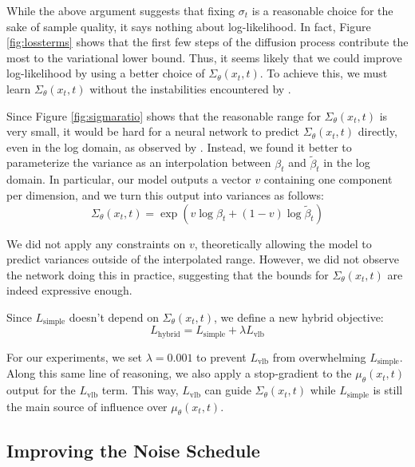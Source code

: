 \documentclass{article}
\begin{document}
While the above argument suggests that fixing $\sigma_t$ is a reasonable choice for the sake of sample quality, it says nothing about log-likelihood. In fact, Figure \ref{fig:lossterms} shows that the first few steps of the diffusion process contribute the most to the variational lower bound. Thus, it seems likely that we could improve log-likelihood by using a better choice of $\Sigma_{\theta}(x_t, t)$. To achieve this, we must learn $\Sigma_{\theta}(x_t, t)$ without the instabilities encountered by \citet{ddpm}.

Since Figure \ref{fig:sigmaratio} shows that the reasonable range for $\Sigma_{\theta}(x_t, t)$ is very small, it would be hard for a neural network to predict $\Sigma_{\theta}(x_t, t)$ directly, even in the log domain, as observed by \citet{ddpm}. Instead, we found it better to parameterize the variance as an interpolation between $\beta_t$ and $\tilde{\beta}_t$ in the log domain. In particular, our model outputs a vector $v$ containing one component per dimension, and we turn this output into variances as follows:
\begin{equation}
\Sigma_{\theta}(x_t, t) = \exp(v \log \beta_t + (1-v) \log \tilde{\beta}_t)
\end{equation}

We did not apply any constraints on $v$, theoretically allowing the model to predict variances outside of the interpolated range. However, we did not observe the network doing this in practice, suggesting that the bounds for $\Sigma_{\theta}(x_t, t)$ are indeed expressive enough.

Since $L_{\text{simple}}$ doesn't depend on $\Sigma_{\theta}(x_t, t)$, we define a new hybrid objective:
\begin{equation}
L_{\text{hybrid}} = L_{\text{simple}} + \lambda L_{\text{vlb}}
\end{equation}

For our experiments, we set $\lambda = 0.001$ to prevent $L_{\text{vlb}}$ from overwhelming $L_{\text{simple}}$. Along this same line of reasoning, we also apply a stop-gradient to the $\mu_{\theta}(x_t, t)$ output for the $L_{\text{vlb}}$ term. This way, $L_{\text{vlb}}$ can guide $\Sigma_{\theta}(x_t, t)$ while $L_{\text{simple}}$ is still the main source of influence over $\mu_{\theta}(x_t, t)$.

\subsection{Improving the Noise Schedule}
\label{sec:schedule}
\end{document}
